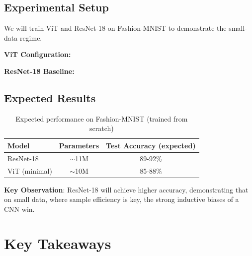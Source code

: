 \documentclass{article}
\begin{document}
\subsection{Experimental Setup}

We will train ViT and ResNet-18 on Fashion-MNIST to demonstrate the small-data regime.

\textbf{ViT Configuration:}


\textbf{ResNet-18 Baseline:}


\subsection{Expected Results}

\begin{table}[h]
\centering
\begin{tabular}{lcc}
\hline
\textbf{Model} & \textbf{Parameters} & \textbf{Test Accuracy (expected)} \\
\hline
ResNet-18 & $\sim$11M & 89-92\% \\
ViT (minimal) & $\sim$10M & 85-88\% \\
\hline
\end{tabular}
\caption{Expected performance on Fashion-MNIST (trained from scratch)}
\end{table}

\textbf{Key Observation}: ResNet-18 will achieve higher accuracy, demonstrating that on small data, where sample efficiency is key, the strong inductive biases of a CNN win.

\section{Key Takeaways}
\end{document}

